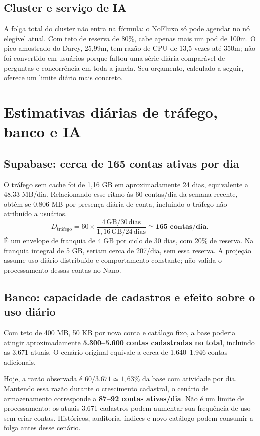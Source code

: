 \documentclass[10pt,a4paper]{article}
\newcommand{\pagechapter}[1]{\clearpage\section{#1}}
\begin{document}
\subsection{Cluster e serviço de IA}
A folga total do cluster não entra na fórmula: o NoFluxo só pode agendar no nó elegível atual. Com teto de reserva de 80\%, cabe apenas mais um pod de 100m. O pico amostrado do Darcy, 25,99m, tem razão de CPU de 13,5 vezes até 350m; não foi convertido em usuários porque faltou uma série diária comparável de perguntas e concorrência em toda a janela. Seu orçamento, calculado a seguir, oferece um limite diário mais concreto.

\pagechapter{Estimativas diárias de tráfego, banco e IA}
\subsection{Supabase: cerca de 165 contas ativas por dia}
O tráfego sem cache foi de 1,16 GB em aproximadamente 24 dias, equivalente a 48,33 MB/dia. Relacionando esse ritmo às 60 contas/dia da semana recente, obtém-se 0,806 MB por presença diária de conta, incluindo o tráfego não atribuído a usuários.
\[
D_{\mathrm{tráfego}}=60\times\frac{4\,\mathrm{GB}/30\,\mathrm{dias}}{1{,}16\,\mathrm{GB}/24\,\mathrm{dias}}
\simeq\textbf{165 contas/dia}.
\]
É um envelope de franquia de 4 GB por ciclo de 30 dias, com 20\% de reserva. Na franquia integral de 5 GB, seriam cerca de 207/dia, sem essa reserva. A projeção assume uso diário distribuído e comportamento constante; não valida o processamento dessas contas no Nano.

\subsection{Banco: capacidade de cadastros e efeito sobre o uso diário}
Com teto de 400 MB, 50 KB por nova conta e catálogo fixo, a base poderia atingir aproximadamente \textbf{5.300–5.600 contas cadastradas no total}, incluindo as 3.671 atuais. O cenário original equivale a cerca de 1.640–1.946 contas adicionais.

Hoje, a razão observada é \(60/3.671\simeq1{,}63\%\) da base com atividade por dia. Mantendo essa razão durante o crescimento cadastral, o cenário de armazenamento corresponde a \textbf{87–92 contas ativas/dia}. Não é um limite de processamento: os atuais 3.671 cadastros podem aumentar sua frequência de uso sem criar contas. Históricos, auditoria, índices e novo catálogo podem consumir a folga antes desse cenário.
\end{document}
